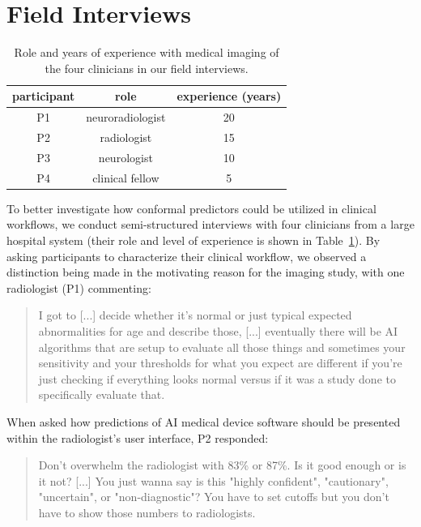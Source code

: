\documentclass[letterpaper]{article} %
\begin{document}
\section{Field Interviews}
    \begin{table}[t]
    \small
    \centering
    \begin{tabular}{ccc}
        \toprule
        \textbf{participant} & \textbf{role} & \textbf{experience (years)} \\
        \midrule
        P1 & neuroradiologist & 20 \\
        P2 & radiologist & 15 \\
        P3 & neurologist & 10 \\
        P4 & clinical fellow & 5 \\
        \bottomrule
    \end{tabular}
    \caption{Role and years of experience with medical imaging of the four clinicians in our field interviews.}
    \label{tab:field}
    \end{table}

    To better investigate how conformal predictors could be utilized in clinical workflows, we conduct semi-structured interviews with four clinicians from a large hospital system (their role and level of experience is shown in Table~\ref{tab:field}).
    By asking participants to characterize their clinical workflow, we observed a distinction being made in the motivating reason for the imaging study, with one radiologist (P1) commenting:
    \begin{quote}
        I got to [...] decide whether it's normal or just typical expected abnormalities for age and describe those, [...] eventually there will be AI algorithms that are setup to evaluate all those things and sometimes your sensitivity and your thresholds for what you expect are different if you're just checking if everything looks normal versus if it was a study done to specifically evaluate that.
    \end{quote}

    When asked how predictions of AI medical device software should be presented within the radiologist's user interface, P2 responded:
    \begin{quote}
        Don't overwhelm the radiologist with 83\% or 87\%. Is it good enough or is it not? [...] You just wanna say is this "highly confident", "cautionary", "uncertain", or "non-diagnostic"? You have to set cutoffs but you don't have to show those numbers to radiologists.
    \end{quote}
\end{document}
